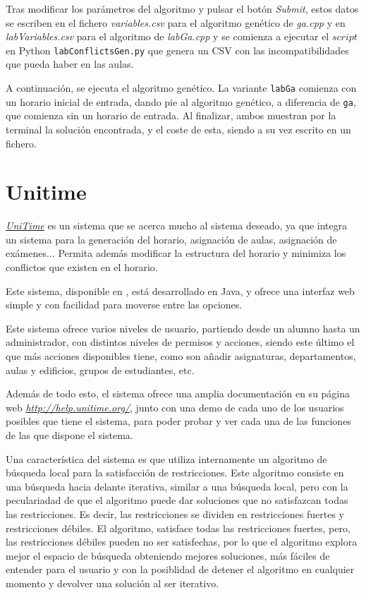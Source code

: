 Tras modificar los parámetros del algoritmo y pulsar el botón \textit{Submit}, estos datos se escriben en el fichero \textit{variables.csv} para el algoritmo genético de \textit{ga.cpp} y en \textit{labVariables.csv} para el algoritmo de \textit{labGa.cpp} y se comienza a ejecutar el $script$ en Python \texttt{labConflictsGen.py} que genera un CSV con las incompatibilidades que pueda haber en las aulas.

A continuación, se ejecuta el algoritmo genético. La variante \texttt{labGa} comienza con un horario inicial de entrada, dando pie al algoritmo genético, a diferencia de \texttt{ga}, que comienza sin un horario de entrada. Al finalizar, ambos muestran por la terminal la solución encontrada, y el coste de esta, siendo a su vez escrito en un fichero.

\section{Unitime}

\href{https://github.com/UniTime/unitime}{\textit{UniTime}} es un sistema que se acerca mucho al sistema deseado, ya que integra un sistema para la generación del horario, asignación de aulas, asignación de exámenes$\ldots$ Permita además modificar la estructura del horario y minimiza los conflictos que existen en el horario.

Este sistema, disponible en \cite{unitime}, está desarrollado en Java, y ofrece una interfaz web simple y con facilidad para moverse entre las opciones.

Este sistema ofrece varios niveles de usuario, partiendo desde un alumno hasta un administrador, con distintos niveles de permisos y acciones, siendo este último el que más acciones disponibles tiene, como son añadir asignaturas, departamentos, aulas y edificios, grupos de estudiantes, etc. 

Además de todo esto, el sistema ofrece una amplia documentación en su página web \href{http://help.unitime.org/}{\textit{http://help.unitime.org/}}, junto con una demo de cada uno de los usuarios posibles que tiene el sistema, para poder probar y ver cada una de las funciones de las que dispone el sistema.

Una característica del sistema es que utiliza internamente un algoritmo de búsqueda local para la satisfacción de restricciones. Este algoritmo consiste en una búsqueda hacia delante iterativa, similar a una búsqueda local, pero con la peculariadad de que el algoritmo puede dar soluciones que no satisfazcan todas las restricciones. Es decir, las restricciones se dividen en restricciones fuertes y restricciones débiles. El algoritmo, satisface todas las restricciones fuertes, pero, las restricciones débiles pueden no ser satisfechas, por lo que el algoritmo explora mejor el espacio de búsqueda obteniendo mejores soluciones, más fáciles de entender para el usuario y con la posiblidad de detener el algoritmo en cualquier momento y devolver una solución al ser iterativo.